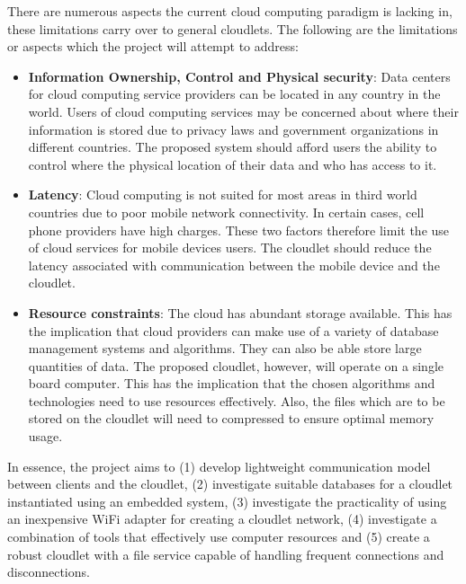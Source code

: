 There are numerous aspects the current cloud computing paradigm is lacking in, these limitations carry over to general cloudlets. The following are the limitations or aspects which the project will attempt to address:

  \begin{itemize}
  \itemsep0em
  \item \textbf{Information Ownership, Control and Physical security}: Data centers for cloud computing service providers can be located in any country in the world. Users
  of cloud computing services may be concerned about where their information is stored due to privacy laws and government organizations in different countries. The proposed
  system should afford users the ability to control where the physical location of their data and who has access to it.

   \item \textbf{Latency}: Cloud computing is not suited for most areas in third world countries due to poor mobile network connectivity. In certain cases, cell phone providers
   have high charges. These two factors therefore limit the use of cloud services for mobile devices users. The cloudlet should reduce the latency associated with communication
   between the mobile device and the cloudlet.

  \item \textbf{Resource constraints}: The cloud has abundant storage available. This has the implication that cloud providers can make use of a variety of database management
  systems and algorithms. They can also
  be able store large quantities of data. The proposed cloudlet, however, will operate on a single board computer. This has the implication that the chosen algorithms and
  technologies need to use resources effectively.
  Also, the files which are to be stored on the cloudlet will need to compressed to ensure optimal memory usage.

 \end{itemize}
 
 In essence, the project aims to (1) develop lightweight communication model
between clients and the cloudlet, (2) investigate suitable databases for a cloudlet instantiated using an embedded system, (3) investigate the practicality of using an inexpensive WiFi adapter for creating a cloudlet network, (4) investigate a combination of tools that effectively use computer resources and (5) create a robust cloudlet with a file service capable of handling frequent connections and disconnections.


